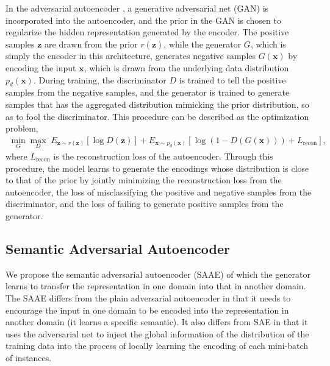 \documentclass{article}
\newcommand{\bb}[1]{\boldsymbol{#1}}
\begin{document}
	In the adversarial autoencoder \cite{makhzani2015adversarial}, a generative adversarial net (GAN) \cite{Goodfellow2014} is incorporated into the autoencoder, and the prior in the GAN is chosen to regularize the hidden representation generated by the encoder. The positive samples $\bb{z}$ are drawn from the prior $r(\bb{z})$, while the generator $G$, which is simply the encoder in this architecture, generates negative samples $G(\bb{x})$ by encoding the input $\bb{x}$, which is drawn from the underlying data distribution $p_d(\bb{x})$. During training, the discriminator $D$ is trained to tell the positive samples from the negative samples, and the generator is trained to generate samples that has the aggregated distribution mimicking the prior distribution, so as to fool the discriminator. This procedure can be described as the optimization problem,
	\begin{align}
		\label{eq:AAE} \min_G \max_D \; E_{\bb{z} \sim r(\bb{z})}[ \log D(\bb{z}) ] + E_{\bb{x} \sim p_d(\bb{x})}[ \log( 1 - D(G(\bb{x})) ) + L_{\text{recon}} ],
	\end{align}
	where $L_{\text{recon}}$ is the reconstruction loss of the autoencoder. Through this procedure, the model learns to generate the encodings whose distribution is close to that of the prior by jointly minimizing the reconstruction loss from the autoencoder, the loss of misclassifying the positive and negative samples from the discriminator, and the loss of failing to generate positive samples from the generator.




\subsection{Semantic Adversarial Autoencoder}

	We propose the semantic adversarial autoencoder (SAAE) of which the generator learns to transfer the representation in one domain into that in another domain. The SAAE differs from the plain adversarial autoencoder in that it needs to encourage the input in one domain to be encoded into the representation in another domain (it learns a specific semantic). It also differs from SAE in that it uses the adversarial net to inject the global information of the distribution of the training data into the process of locally learning the encoding of each mini-batch of instances.
\end{document}
